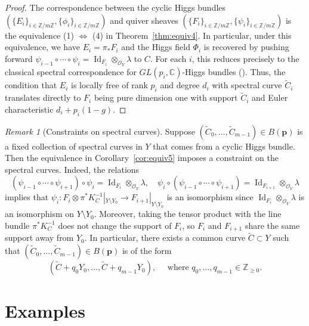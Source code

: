 \documentclass[11pt]{amsart}
\theoremstyle{plain}
\theoremstyle{definition}
\theoremstyle{remark}
\newtheorem{rem}[theorem]{Remark}
\def\Z{\mathbb{Z}}
\def\C{\mathbb{C}}
\def\O{\mathcal{O}}
\def\zm{\mathbb{Z}/m\mathbb{Z}}
\def\tC{\widetilde{C}}
\begin{document}
\begin{proof}
    The correspondence between the cyclic Higgs bundles $(\{E_i\}_{i\in \zm}, \{\phi_i\}_{i\in \zm})$ and quiver sheaves $(\{F_i\}_{i\in\zm}, \{\psi_i\}_{i\in\zm})$ is the equivalence (1) $\Leftrightarrow$ (4) in Theorem~\ref{thm:equiv4}. In particular, under this equivalence, we have $E_i =\pi_* F_i$ and the Higgs field $\Phi_i$ is recovered by pushing forward $\psi_{i-1}\circ\cdots \circ \psi_{i} =  \operatorname{Id}_{F_i}\otimes_{\O_Y}\lambda$ to $C$. For each $i$, this reduces precisely to the classical spectral correspondence for $GL(p_i, \C)$-Higgs bundles (\cite{bnr, simpsonmoduli}). Thus, the condition that $E_i$ is locally free of rank $p_i$ and degree $d_i$ with spectral curve $\tC_i$ translates directly to $F_i$ being pure dimension one with support $\tC_i$ and Euler characteristic $d_i+p_i(1-g)$.  
    
\end{proof}

\begin{rem}[Constraints on spectral curves]\label{rem:constraints}
Suppose $(\tC_0, \dots,\tC_{m-1})\in B(\bm{p})$ is a fixed collection of spectral curves in $Y$ that comes from a cyclic Higgs bundle. Then the equivalence in Corollary~\ref{cor:equiv5} imposes a constraint on the spectral curves. Indeed, the relations 
\[(\psi_{i-1}\circ\cdots \circ\psi_{i+1})\circ \psi_{i} = \operatorname{Id}_{F_i}\otimes_{\O_Y} \lambda,\quad \psi_{i}\circ (\psi_{i-1}\circ\cdots \circ \psi_{i+1})= \operatorname{Id}_{F_{i+1}}\otimes_{\O_Y} \lambda \]
implies that $\psi_{i}:F_i\otimes \pi^*K_C^{-1}|_{Y\setminus Y_0}\to F_{i+1}|_{Y\setminus Y_0} $ is an isomorphism since $\operatorname{Id}_{F_i}\otimes_{\O_Y} \lambda $ is an isomorphism on $Y\setminus Y_0$. Moreover, taking the tensor product with the line bundle $\pi^{*}K_C^{-1}$ does not change the support of $F_i$, so $F_i$ and $F_{i+1}$ share the same support away from $Y_0$. In particular, there exists a common curve $\tC\subset Y$ such that $(\tC_0, \dots,\tC_{m-1})\in B(\bm{p})$ is of the form 
\begin{equation}\label{eq:spectral curve}
    (\tC + q_0 Y_0 , \dots, \tC + q_{m-1} Y_0) ,\quad \textrm{ where }q_0,\dots, q_{m-1} \in \Z_{\geq 0}.
\end{equation}

\end{rem}






\section{Examples}\label{sec:examples}
\end{document}
